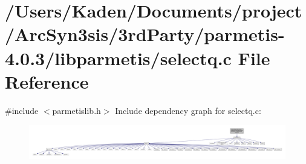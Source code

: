 \hypertarget{a00404}{}\section{/\+Users/\+Kaden/\+Documents/project/\+Arc\+Syn3sis/3rd\+Party/parmetis-\/4.0.3/libparmetis/selectq.c File Reference}
\label{a00404}
{\ttfamily \#include $<$parmetislib.\+h$>$}\newline
Include dependency graph for selectq.\+c\+:\nopagebreak
\begin{figure}[H]
\begin{center}
\leavevmode
\includegraphics[width=350pt]{a00405}
\end{center}
\end{figure}
